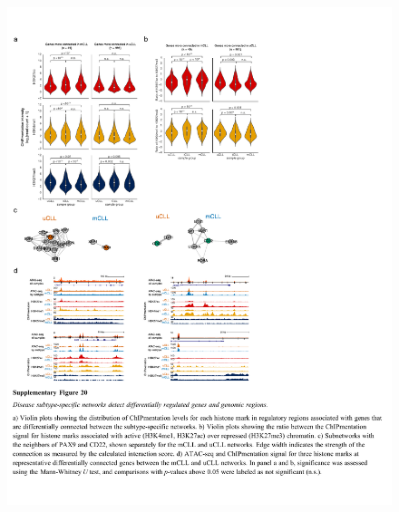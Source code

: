 \documentclass[10pt,]{article}
\begin{document}
\begin{figure}
\centering
\includegraphics[width=1.000\hsize]{figures/Supplementary_Information_20.pdf}
\end{figure}
\clearpage

\renewcommand\refname{References}

\end{document}
